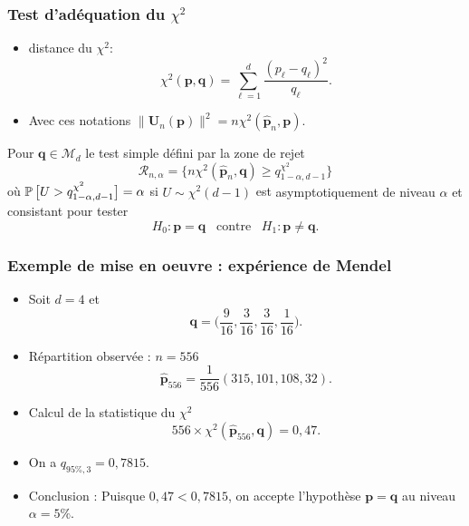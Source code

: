 \begin{frame}
\frametitle{Test d'adéquation du $\chi^2$}
\begin{itemize}
\item  distance du $\chi^2$:
$$\chi^2(\boldsymbol{p},\boldsymbol{q})=\sum_{\ell=1}^d \frac{(p_\ell-q_\ell)^2}{q_\ell}.$$
\item Avec ces notations
$\|{\boldsymbol U}_n(\boldsymbol{p})\|^2=n\chi^2(\widehat {\boldsymbol p}_n,\boldsymbol{p}).$
\end{itemize}
\begin{prop}
Pour $\boldsymbol{q} \in {\mathcal M}_d$ le test simple défini par la zone de rejet
$${\mathcal R}_{n,\alpha} = \big\{n\chi^2(\widehat {\boldsymbol p}_n,\boldsymbol{q}) \geq q_{1-\alpha,d-1}^{\chi^2} \big\}$$
où
$\operatorname{{\mathbb P}}\big[U > q_{1-\alpha,d-1}^{\chi^2}\big]=\alpha$ si $U \sim \chi^2(d-1)$ est
\alert{asymptotiquement de niveau $\alpha$ et consistant} pour tester
$$H_0:\boldsymbol{p}=\boldsymbol{q}\;\;\;\text{contre}\;\;\;
H_1:\boldsymbol{p}\neq\boldsymbol{q}.$$
\end{prop}
\end{frame}

\begin{frame}
\frametitle{Exemple de mise en oeuvre : expérience de Mendel}
\begin{itemize}
\item Soit $d=4$ et
$$\boldsymbol{q}=\Big(\frac{9}{16},\frac{3}{16},\frac{3}{16},\frac{1}{16}\Big).$$
\item \alert{Répartition observée} : $n=556$
$$\widehat {\boldsymbol p}_{556} = \frac{1}{556}(315,101,108,32).$$
\item \alert{Calcul de la statistique du $\chi^2$}
$$556 \times \chi^2(\widehat {\boldsymbol p}_{556}, \boldsymbol{q})=0,47.$$
\item On a $q_{95\%, 3}=0,7815$.
\item \alert{Conclusion :} Puisque $0,47 < 0,7815$, on accepte l'hypothèse $\boldsymbol{p}=\boldsymbol{q}$ au niveau $\alpha = 5\%$.
\end{itemize}
\end{frame}













